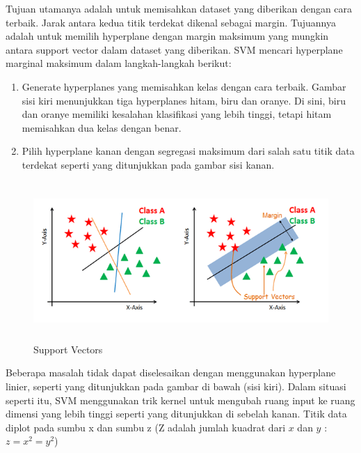 \par Tujuan utamanya adalah untuk memisahkan dataset yang diberikan dengan cara terbaik. Jarak antara kedua titik terdekat dikenal sebagai margin. Tujuannya adalah untuk memilih hyperplane dengan margin maksimum yang mungkin antara support vector dalam dataset yang diberikan. SVM mencari hyperplane marginal maksimum dalam langkah-langkah berikut:

\begin{enumerate}[1.]
	\itemsep0em
	\item Generate hyperplanes yang memisahkan kelas dengan cara terbaik. Gambar sisi kiri menunjukkan tiga hyperplanes hitam, biru dan oranye. Di sini, biru dan oranye memiliki kesalahan klasifikasi yang lebih tinggi, tetapi hitam memisahkan dua kelas dengan benar.

	\item Pilih hyperplane kanan dengan segregasi maksimum dari salah satu titik data terdekat seperti yang ditunjukkan pada gambar sisi kanan.
\end{enumerate}

\begin{figure}[H]
	\centering
	\includegraphics[width=14cm, height=6cm]{gambar/index2_ub1uzd}
	\caption{Support Vectors}
	\label{index3_souoaz}
\end{figure}
\par Beberapa masalah tidak dapat diselesaikan dengan menggunakan hyperplane linier, seperti yang ditunjukkan pada gambar di bawah (sisi kiri). Dalam situasi seperti itu, SVM menggunakan trik kernel untuk mengubah ruang input ke ruang dimensi yang lebih tinggi seperti yang ditunjukkan di sebelah kanan. Titik data diplot pada sumbu x dan sumbu z (Z adalah jumlah kuadrat dari $x$ dan $y$ : $z=x^2=y^2$)

